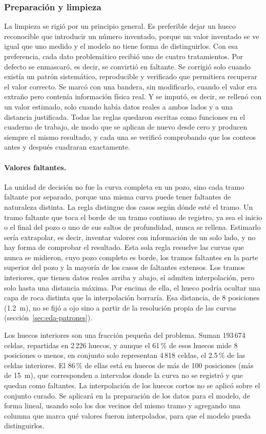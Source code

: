 \documentclass[11pt,a4paper]{article}
\begin{document}
\subsubsection{Preparación y limpieza}
\label{sec:eda-limpieza}

La limpieza se rigió por un principio general. Es preferible dejar un hueco reconocible que introducir un número inventado, porque un valor inventado se ve igual que uno medido y el modelo no tiene forma de distinguirlos. Con esa preferencia, cada dato problemático recibió uno de cuatro tratamientos. Por defecto se enmascaró, es decir, se convirtió en faltante. Se corrigió solo cuando existía un patrón sistemático, reproducible y verificado que permitiera recuperar el valor correcto. Se marcó con una bandera, sin modificarlo, cuando el valor era extraño pero contenía información física real. Y se imputó, es decir, se rellenó con un valor estimado, solo cuando había datos reales a ambos lados y a una distancia justificada. Todas las reglas quedaron escritas como funciones en el cuaderno de trabajo, de modo que se aplican de nuevo desde cero y producen siempre el mismo resultado, y cada una se verificó comprobando que los conteos antes y después cuadraran exactamente.

\paragraph{Valores faltantes.} La unidad de decisión no fue la curva completa en un pozo, sino cada tramo faltante por separado, porque una misma curva puede tener faltantes de naturaleza distinta. La regla distingue dos casos según dónde esté el tramo. Un tramo faltante que toca el borde de un tramo continuo de registro, ya sea el inicio o el final del pozo o uno de sus saltos de profundidad, nunca se rellena. Estimarlo sería extrapolar, es decir, inventar valores con información de un solo lado, y no hay forma de comprobar el resultado. Esta sola regla resuelve las curvas que nunca se midieron, cuyo pozo completo es borde, los tramos faltantes en la parte superior del pozo y la mayoría de los casos de faltantes extensos. Los tramos interiores, que tienen datos reales arriba y abajo, sí admiten interpolación, pero solo hasta una distancia máxima. Por encima de ella, el hueco podría ocultar una capa de roca distinta que la interpolación borraría. Esa distancia, de 8 posiciones (1.2~m), no se fijó a ojo sino a partir de la resolución propia de las curvas (sección~\ref{sec:eda-patrones}).

Los huecos interiores son una fracción pequeña del problema. Suman 193\,674 celdas, repartidas en 2\,226 huecos, y aunque el 61\,\% de esos huecos mide 8 posiciones o menos, en conjunto solo representan 4\,818 celdas, el 2.5\,\% de las celdas interiores. El 86\,\% de ellas está en huecos de más de 100 posiciones (más de 15~m), que corresponden a intervalos donde la curva no se registró y que quedan como faltantes. La interpolación de los huecos cortos no se aplicó sobre el conjunto curado. Se aplicará en la preparación de los datos para el modelo, de forma lineal, usando solo los dos vecinos del mismo tramo y agregando una columna que marca qué valores fueron interpolados, para que el modelo pueda distinguirlos.
\end{document}
